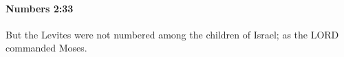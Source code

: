 
		\paragraph{Numbers 2:33} %
			\label{NUMBERS-2-33}

			But the Levites were not numbered among the children of Israel; as the LORD commanded Moses.


